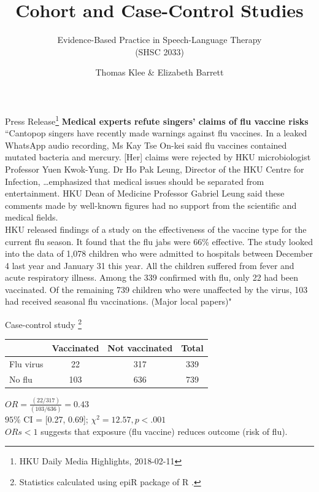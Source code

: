 \documentclass{beamer}
\title{Cohort and Case-Control Studies}
\subtitle{}
\author{Evidence-Based Practice in Speech-Language Therapy \\ (SHSC 2033)}
\institute{Session 5 Exercise}
\date{Thomas Klee \& Elizabeth Barrett}
\begin{document}
\begin{frame}
	\titlepage
\end{frame}

\begin{frame}{Press Release\footnote{\tiny{HKU Daily Media Highlights, 2018-02-11}}}
\textbf{Medical experts refute singers' claims of flu vaccine risks}
\\
\vspace{3mm}
\footnotesize{``Cantopop singers have recently made warnings against flu vaccines. In a leaked WhatsApp audio recording, Ms Kay Tse On-kei said flu vaccines contained mutated bacteria and mercury. [Her] claims were rejected by HKU microbiologist Professor Yuen Kwok-Yung. Dr Ho Pak Leung, Director of the HKU Centre for Infection, \dots emphasized that medical issues should be separated from entertainment. HKU Dean of Medicine Professor Gabriel Leung said these comments made by well-known figures had no support from the scientific and medical fields. \\
\vspace{3mm}
HKU released findings of a study on the effectiveness of the vaccine type for the current flu season. It found that the flu jabs were 66\% effective. The study looked into the data of 1,078 children who were admitted to hospitals between December 4 last year and January 31 this year. All the children suffered from fever and acute respiratory illness. Among the 339 confirmed with flu, only 22 had been vaccinated. Of the remaining 739 children who were unaffected by the virus, 103 had received seasonal flu vaccinations. (Major local papers)"}
\end{frame}

\begin{frame}{Case-control study \footnote{\tiny{Statistics calculated using epiR package of R \citep{Stevenson2017}.}}}
	\begin{table}
	\centering
	\begin{tabular}{ l c c c }
	\toprule
	& Vaccinated & Not vaccinated & Total\\
	\midrule
	Flu virus & 22 & 317 & 339\\
	No flu & 103 & 636 &  739\\
	\bottomrule
	\end{tabular} 
	\end{table}
	
	\footnotesize{
	$ OR = \frac{(22/317)}{(103/636)} = 0.43 $ \\
 	\vspace{3mm}
	$ 95\% $ CI = [0.27, 0.69];  $\chi^2 = 12.57, p < .001 $ \\
	\vspace{3mm}
	$ ORs < 1 $ suggests that exposure (flu vaccine) reduces outcome (risk of flu).
	}
\end{frame}
\end{document}
